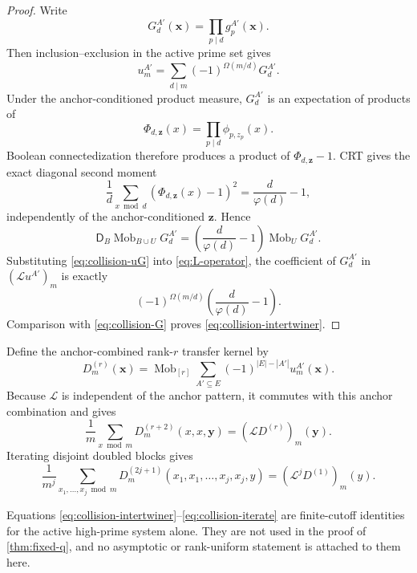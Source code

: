 \documentclass[11pt]{article}
\theoremstyle{definition}
\theoremstyle{remark}
\newcommand{\1}{\mathbf 1}
\newcommand{\ph}{\varphi}
\newcommand{\Om}{\Omega}
\newcommand{\Lcal}{\mathcal L}
\begin{document}
\begin{proof}
Write
\[
G_d^{A'}(\mathbf x)=\prod_{p\mid d}g_p^{A'}(\mathbf x).
\]
Then inclusion--exclusion in the active prime set gives
\begin{equation}\label{eq:collision-uG}
u_m^{A'}
=\sum_{d\mid m}(-1)^{\Om(m/d)}G_d^{A'}.
\end{equation}
Under the anchor-conditioned product measure, $G_d^{A'}$ is an expectation
of products of
\[
\Phi_{d,\mathbf z}(x)=\prod_{p\mid d}\phi_{p,z_p}(x).
\]
Boolean connectedization therefore produces a product of
$\Phi_{d,\mathbf z}-1$.  CRT gives the exact diagonal second moment
\begin{equation}\label{eq:collision-second-moment}
\frac1d\sum_{x\bmod d}(\Phi_{d,\mathbf z}(x)-1)^2
=\frac d{\ph(d)}-1,
\end{equation}
independently of the anchor-conditioned $\mathbf z$.  Hence
\begin{equation}\label{eq:collision-G}
\mathsf D_B\operatorname{Mob}_{B\cup U}G_d^{A'}
=\left(\frac d{\ph(d)}-1\right)\operatorname{Mob}_UG_d^{A'}.
\end{equation}
Substituting \eqref{eq:collision-uG} into \eqref{eq:L-operator}, the coefficient
of $G_d^{A'}$ in $(\Lcal u^{A'})_m$ is exactly
\[
(-1)^{\Om(m/d)}\left(\frac d{\ph(d)}-1\right).
\]
Comparison with \eqref{eq:collision-G} proves
\eqref{eq:collision-intertwiner}.
\end{proof}

Define the anchor-combined rank-$r$ transfer kernel by
\begin{equation}\label{eq:collision-Dr}
D_m^{(r)}(\mathbf x)
=\operatorname{Mob}_{[r]}
\sum_{A'\subseteq E}(-1)^{|E|-|A'|}u_m^{A'}(\mathbf x).
\end{equation}
Because $\Lcal$ is independent of the anchor pattern, it commutes with this
anchor combination and gives
\begin{equation}\label{eq:collision-one}
\frac1m\sum_{x\bmod m}D_m^{(r+2)}(x,x,\mathbf y)
=(\Lcal D^{(r)})_m(\mathbf y).
\end{equation}
Iterating disjoint doubled blocks gives
\begin{equation}\label{eq:collision-iterate}
\frac1{m^j}\sum_{x_1,\ldots,x_j\bmod m}
D_m^{(2j+1)}(x_1,x_1,\ldots,x_j,x_j,y)
=(\Lcal^jD^{(1)})_m(y).
\end{equation}

Equations \eqref{eq:collision-intertwiner}--\eqref{eq:collision-iterate} are
finite-cutoff identities for the active high-prime system alone.  They are not
used in the proof of \cref{thm:fixed-q}, and no asymptotic or rank-uniform
statement is attached to them here.
\end{document}
